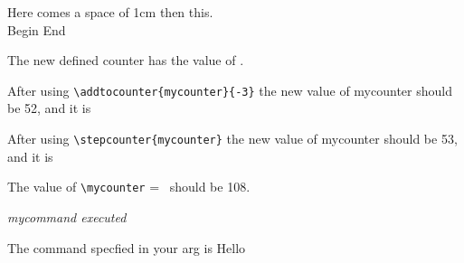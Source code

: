     Here comes a space of 1cm \hspace{1cm} then this.\\
    Begin \hfill End    %

    \setcounter{mycounter}{55}

    The new defined counter has the value of \themycounter.

    \addtocounter{mycounter}{-3}
    After using \verb|\addtocounter{mycounter}{-3}| the new value 
    of mycounter should be 52, and it is \themycounter

    After using \verb|\stepcounter{mycounter}| the new value 
    of mycounter should be 53, and it is \themycounter
    
    \setcounter{b}{55}
    \addtocounter{mycounter}{\value{b}}
    The value of \verb|\mycounter| = \themycounter\ should be 108.

    \newcommand{\mycommand}{\textit{mycommand executed}}
    \mycommand

    \newcommand{\mycommandprintarg}[1]{
        The command specfied in your arg is #1
    }
    \mycommandprintarg{Hello}


    \newcommand{\printargs}[2][This is the default arg]{
        Arg1 #1\\
        Arg2 #2\\
    }

